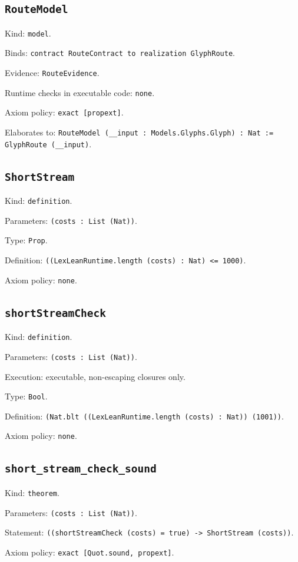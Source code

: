 \documentclass[11pt]{article}
\begin{document}
\subsection*{\texttt{RouteModel}}
\noindent Kind: \texttt{model}.\par
\noindent Binds: \texttt{contract RouteContract to realization GlyphRoute}.\par
\noindent Evidence: \texttt{RouteEvidence}.\par
\noindent Runtime checks in executable code: \texttt{none}.\par
\noindent Axiom policy: \texttt{exact [propext]}.\par
\noindent Elaborates to: \texttt{RouteModel (\_\_input : Models.Glyphs.Glyph) : Nat := GlyphRoute (\_\_input)}.\par
\subsection*{\texttt{ShortStream}}
\noindent Kind: \texttt{definition}.\par
\noindent Parameters: \texttt{(costs : List (Nat))}.\par
\noindent Type: \texttt{Prop}.\par
\noindent Definition: \texttt{((LexLeanRuntime.length (costs) : Nat) <= 1000)}.\par
\noindent Axiom policy: \texttt{none}.\par
\subsection*{\texttt{shortStreamCheck}}
\noindent Kind: \texttt{definition}.\par
\noindent Parameters: \texttt{(costs : List (Nat))}.\par
\noindent Execution: executable, non-escaping closures only.\par
\noindent Type: \texttt{Bool}.\par
\noindent Definition: \texttt{(Nat.blt ((LexLeanRuntime.length (costs) : Nat)) (1001))}.\par
\noindent Axiom policy: \texttt{none}.\par
\subsection*{\texttt{short\_stream\_check\_sound}}
\noindent Kind: \texttt{theorem}.\par
\noindent Parameters: \texttt{(costs : List (Nat))}.\par
\noindent Statement: \texttt{((shortStreamCheck (costs) = true) -> ShortStream (costs))}.\par
\noindent Axiom policy: \texttt{exact [Quot.sound, propext]}.\par
\end{document}
